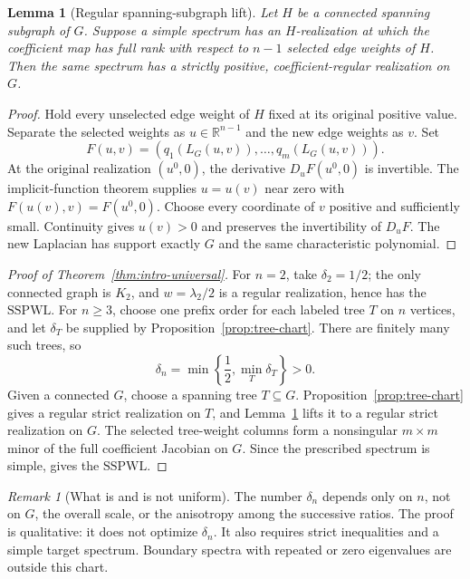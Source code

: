 \documentclass[11pt,reqno]{amsart}
\newtheorem{lemma}[theorem]{Lemma}
\theoremstyle{definition}
\theoremstyle{remark}
\newtheorem{remark}[theorem]{Remark}
\newcommand{\R}{\mathbb R}
\newcommand{\SSPWL}{\ensuremath{\mathrm{SSPWL}}}
\begin{document}
\begin{lemma}[Regular spanning-subgraph lift]\label{lem:supergraph}
Let $H$ be a connected spanning subgraph of $G$.  Suppose a simple spectrum
has an $H$-realization at which the coefficient map has full rank with
respect to $n-1$ selected edge weights of $H$.  Then the same spectrum has a
strictly positive, coefficient-regular realization on $G$.
\end{lemma}

\begin{proof}
Hold every unselected edge weight of $H$ fixed at its original positive
value.  Separate the selected weights as $u\in\R^{n-1}$ and the new edge
weights as $v$.  Set
\[
 F(u,v)=(q_1(L_G(u,v)),\ldots,q_m(L_G(u,v))).
\]
At the original realization $(u^0,0)$, the derivative $D_uF(u^0,0)$ is
invertible.  The implicit-function theorem supplies $u=u(v)$ near zero with
$F(u(v),v)=F(u^0,0)$.  Choose every coordinate of $v$ positive and
sufficiently small.  Continuity gives $u(v)>0$ and preserves the
invertibility of $D_uF$.  The new Laplacian has support exactly $G$ and the
same characteristic polynomial.
\end{proof}

\begin{proof}[Proof of Theorem~\ref{thm:intro-universal}]
For $n=2$, take $\delta_2=1/2$; the only connected graph is $K_2$, and
$w=\lambda_2/2$ is a regular realization, hence has the \SSPWL.  For
$n\ge3$, choose one prefix order for each
labeled tree $T$ on $n$ vertices, and let $\delta_T$ be supplied by
Proposition~\ref{prop:tree-chart}.  There are finitely many such trees, so
\[
 \delta_n=\min\left\{\frac12,\min_T\delta_T\right\}>0.
\]
Given a connected $G$, choose a spanning tree $T\subseteq G$.
Proposition~\ref{prop:tree-chart} gives a regular strict realization on $T$,
and Lemma~\ref{lem:supergraph} lifts it to a regular strict realization on
$G$.  The selected tree-weight columns form a nonsingular $m\times m$ minor
of the full coefficient Jacobian on $G$.  Since the prescribed spectrum is
simple, \cite[Theorem~3.8]{CFGL2026} gives the \SSPWL.
\end{proof}

\begin{remark}[What is and is not uniform]
The number $\delta_n$ depends only on $n$, not on $G$, the overall scale, or
the anisotropy among the successive ratios.  The proof is qualitative: it
does not optimize $\delta_n$.  It also requires strict inequalities and a
simple target spectrum.  Boundary spectra with repeated or zero eigenvalues
are outside this chart.
\end{remark}
\end{document}
